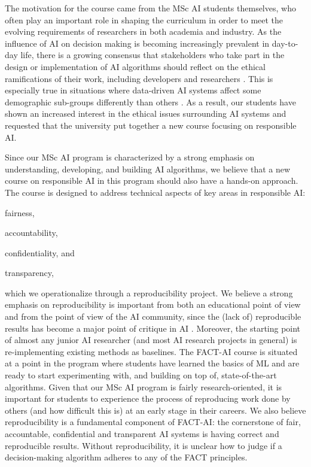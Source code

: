 \documentclass[letterpaper]{article}
\begin{document}
The motivation for the course came from the MSc AI students themselves, who often play an important role in shaping the curriculum in order to meet the evolving requirements of researchers in both academia and industry.
As the influence of \ac{AI} on decision making is becoming increasingly prevalent in day-to-day life, there is a growing consensus that stakeholders who take part in the design or implementation of \ac{AI} algorithms should reflect on the ethical ramifications of their work, including developers and researchers \cite{campbell2021_responsible}.
This is especially true in situations where data-driven AI systems affect some demographic sub-groups differently than others \cite{angwin2016machine, o2017ivory}.
As a result, our students have shown an increased interest in the ethical issues surrounding AI systems and requested that the university put together a new course focusing on responsible AI.

Since our MSc AI program is characterized by a strong emphasis on understanding, developing, and building AI algorithms, we believe that a new course on responsible AI in this program should also have a hands-on approach.
The course is designed to address technical aspects of key areas in responsible AI:
\begin{enumerate*}[label=(\roman*)]
\item fairness,
\item accountability,
\item confidentiality, and
\item transparency,
\end{enumerate*}
which we operationalize through a reproducibility project.
We believe a strong emphasis on reproducibility is important from both an educational point of view and from the point of view of the AI community, since the (lack of) reproducible results has become a major point of critique in \ac{AI} \cite{hutson2018artificial}.
Moreover, the starting point of almost any junior AI researcher (and most AI research projects in general) is re-implementing existing methods as baselines.
The FACT-AI course is situated at a point in the program where students have learned the basics of ML and are ready to start experimenting with, and building on top of, state-of-the-art algorithms.
Given that our MSc AI program is fairly research-oriented, it is important for students to experience the process of reproducing work done by others (and how difficult this is) at an early stage in their careers.
We also believe reproducibility is a fundamental component of FACT-AI: the cornerstone of fair, accountable, confidential and transparent \ac{AI} systems is having correct and reproducible results.
Without reproducibility, it is unclear how to judge if a decision-making algorithm adheres to any of the FACT principles.
\end{document}
